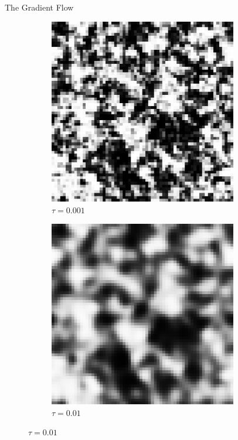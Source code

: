 \documentclass[18pt]{beamer}
\begin{document}
\begin{frame}{}
\begin{columns}[t]
\begin{column}{0.32\linewidth}
\begin{block}{The Gradient Flow}
\begin{figure}[h]
\begin{subfigure}[b]{\Width}
                \includegraphics[width=0.9\textwidth]{gf1.png}
                \caption{$\tau=0.001$}
              \end{subfigure}%
              \begin{subfigure}[b]{\Width}\centering
                \includegraphics[width=0.9\textwidth]{gf2.png}
                \caption{$\tau=0.01$}
              \end{subfigure}%

\end{figure}
\end{block}
\end{column}
\end{columns}
\end{frame}
\end{document}
